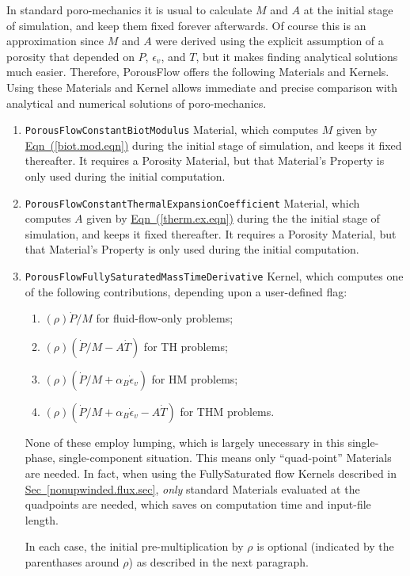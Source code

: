 \documentclass[12pt]{report}
\begin{document}
In standard poro-mechanics it is usual to calculate $M$ and $A$ at the
initial stage of simulation, and keep them fixed forever afterwards.
Of course this is an approximation since $M$ and $A$ were derived
using the explicit assumption of a porosity that depended on $P$,
$\epsilon_{v}$, and $T$, but it makes finding analytical solutions
much easier.  Therefore, PorousFlow offers the following Materials and
Kernels.  Using these Materials and Kernel allows immediate and precise
comparison with analytical and numerical solutions of poro-mechanics.
\begin{enumerate}
\item {\tt PorousFlowConstantBiotModulus} Material, which computes $M$
  given by \hyperref[biot.mod.eqn]{Eqn~(\ref*{biot.mod.eqn})} during the
  initial stage of simulation, and keeps it fixed thereafter.  It
  requires a Porosity Material, but that Material's Property is only
  used during the initial computation.
\item {\tt PorousFlowConstantThermalExpansionCoefficient} Material,
  which computes $A$ given by
  \hyperref[therm.ex.eqn]{Eqn~(\ref*{therm.ex.eqn})} during the the
  initial stage of simulation, and keeps it fixed thereafter.  It
  requires a Porosity Material, but that Material's Property is only
  used during the initial computation.
\item {\tt PorousFlowFullySaturatedMassTimeDerivative} Kernel, which
  computes one of the following contributions, depending upon a
  user-defined flag:
\begin{enumerate}
\item $(\rho) \dot{P}/M$ for fluid-flow-only problems;
\item $(\rho)(\dot{P}/M - A\dot{T})$ for TH problems;
\item $(\rho)(\dot{P}/M + \alpha_{B}\dot{\epsilon}_{v})$ for HM
  problems;
\item $(\rho)(\dot{P}/M + \alpha_{B}\dot{\epsilon}_{v} - A\dot{T})$
  for THM problems.
\end{enumerate}
None of these employ lumping, which is largely unecessary in this
single-phase, single-component situation.  This means only
``quad-point'' Materials are needed.  In fact, when
using the FullySaturated flow Kernels described in
\hyperref[nonupwinded.flux.sec]{Sec~\ref*{nonupwinded.flux.sec}}, {\em
  only} standard Materials evaluated at the quadpoints are needed, which saves
on computation time and input-file length.

In each case, the initial pre-multiplication by $\rho$ is optional
(indicated by the parenthases around $\rho$) as
described in the next paragraph.
\end{enumerate}
\end{document}
